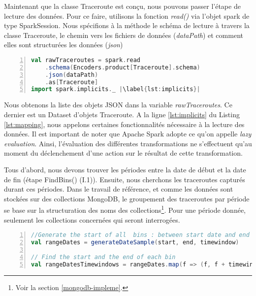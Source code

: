Maintenant que la classe Traceroute est conçu, nous pouvons passer l'étape de lecture des données. Pour ce faire, utilisons la fonction \textit{read()} via l'objet spark de type SparkSession. Nous spécifions à la méthode le schéma de lecture à travers la classe Traceroute, le chemin vers les fichiers de données (\textit{dataPath}) et comment elles sont structurées les données (\textit{json})
\begin{lstlisting}[language=scala,firstnumber=1, caption={Le mapping entre données et cas class},label={lst:mapping}, basicstyle = \footnotesize,escapechar=|,numbers=left,
stepnumber=1]
val rawTraceroutes = spark.read
	.schema(Encoders.product[Traceroute].schema)
	.json(dataPath)
	.as[Traceroute]
import spark.implicits._ |\label{lst:implicits}|
 \end{lstlisting}

Nous obtenons la liste des objets JSON dans la variable \textit{rawTraceroutes}. Ce dernier est un Dataset d'objets  Traceroute. A la ligne \ref{lst:implicits} du Listing \ref{lst:mapping}, nous appelons certaines fonctionnalités nécessaire à la lecture des données. Il est important de noter que Apache Spark adopte ce qu'on appelle \textit{lazy evaluation}. Ainsi, l'évaluation des différentes transformations ne s'effectuent qu'au moment du déclenchement d'une action sur le résultat de cette transformation.

Tous d'abord, nous devons trouver les périodes entre la date de début et la date de fin (étape FindBins()  (I.1)).  Ensuite, nous cherchons les traceroutes capturés durant ces périodes. 
Dans le travail de référence, et comme les données sont stockées sur des collections MongoDB, le groupement des traceroutes par période se base sur la structuration des noms des collections\footnote{Voir la section \ref{mongodb-impleme}.}. Pour une période donnée, seulement les collections concernées qui seront interrogées.

\begin{lstlisting}[language=scala,firstnumber=1, caption={étape FindBins()  (I.1)},label={lst:findbins}, basicstyle = \small,escapechar=|,numbers=left,
stepnumber=1]
//Generate the start of all  bins : between start date and end date espaced by the timewindow
val rangeDates = generateDateSample(start, end, timewindow)

// Find the start and the end of each bin
val rangeDatesTimewindows = rangeDates.map(f => (f, f + timewindow))
\end{lstlisting}

